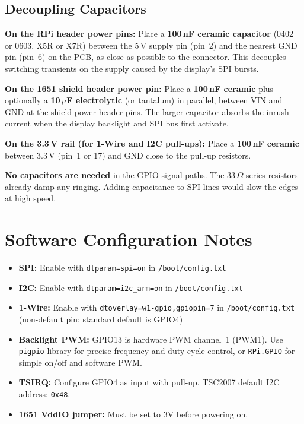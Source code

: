 \documentclass[11pt,a4paper]{article}
\begin{document}
\subsection{Decoupling Capacitors}

\begin{notebox}
\textbf{On the RPi header power pins:}
Place a \textbf{100\,nF ceramic capacitor} (0402 or 0603, X5R or X7R)
between the 5\,V supply pin (pin~2) and the nearest GND pin (pin~6)
on the PCB, as close as possible to the connector.
This decouples switching transients on the supply caused by the display's
SPI bursts.

\smallskip
\textbf{On the 1651 shield header power pin:}
Place a \textbf{100\,nF ceramic} plus optionally a \textbf{10\,$\mu$F electrolytic}
(or tantalum) in parallel, between VIN and GND at the shield power header pins.
The larger capacitor absorbs the inrush current when the display backlight
and SPI bus first activate.

\smallskip
\textbf{On the 3.3\,V rail (for 1-Wire and I2C pull-ups):}
Place a \textbf{100\,nF ceramic} between 3.3\,V (pin~1 or 17) and GND
close to the pull-up resistors.

\smallskip
\textbf{No capacitors are needed} in the GPIO signal paths.
The 33\,$\Omega$ series resistors already damp any ringing.
Adding capacitance to SPI lines would slow the edges at high speed.
\end{notebox}

\section{Software Configuration Notes}

\begin{itemize}[noitemsep]
  \item \textbf{SPI:} Enable with \texttt{dtparam=spi=on} in \texttt{/boot/config.txt}
  \item \textbf{I2C:} Enable with \texttt{dtparam=i2c\_arm=on} in \texttt{/boot/config.txt}
  \item \textbf{1-Wire:} Enable with
        \texttt{dtoverlay=w1-gpio,gpiopin=7} in \texttt{/boot/config.txt}
        (non-default pin; standard default is GPIO4)
  \item \textbf{Backlight PWM:} GPIO13 is hardware PWM channel~1 (PWM1).
        Use \texttt{pigpio} library for precise frequency and duty-cycle control,
        or \texttt{RPi.GPIO} for simple on/off and software PWM.
  \item \textbf{TSIRQ:} Configure GPIO4 as input with pull-up.
        TSC2007 default I2C address: \texttt{0x48}.
  \item \textbf{1651 VddIO jumper:} Must be set to 3V before powering on.
\end{itemize}
\end{document}
